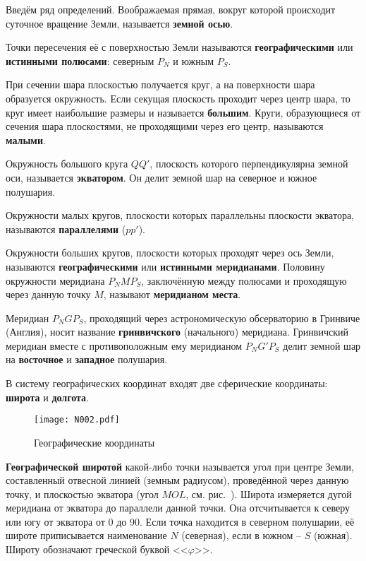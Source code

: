 Введём ряд определений. Воображаемая прямая, вокруг которой происходит
суточное вращение Земли, называется \textbf{земной осью}.

Точки пересечения её с поверхностью Земли называются
\textbf{географическими} или \textbf{истинными полюсами}: северным
$P_N$ и южным $P_S$.

При сечении шара плоскостью получается круг, а на поверхности шара
образуется окружность. Если секущая плоскость проходит через центр
шара, то круг имеет наибольшие размеры и называется
\textbf{большим}. Круги, образующиеся от сечения шара плоскостями, не
проходящими через его центр, называются \textbf{малыми}.

Окружность большого круга $QQ'$, плоскость которого перпендикулярна
земной оси, называется \textbf{экватором}. Он делит земной шар на
северное и южное полушария.

Окружности малых кругов, плоскости которых параллельны плоскости
экватора, называются \textbf{параллелями} ($pp'$).

Окружности больших кругов, плоскости которых проходят через ось Земли,
называются 
\textbf{географическими} или \textbf{истинными
  меридианами}. Половину окружности меридиана $P_NMP_S$, заключённую
между полюсами и проходящую через данную точку $M$, называют
\textbf{меридианом места}.

Меридиан $P_NGP_S$, проходящий через астрономическую обсерваторию в
Гринвиче (Англия), носит название \textbf{гринвичского} (начального)
меридиана. Гринвичский меридиан вместе с противоположным ему
меридианом $P_NG'P_S$ делит земной шар на \textbf{восточное} и
\textbf{западное} полушария.

В систему географических координат входят две сферические координаты:
 \textbf{широта} и \textbf{долгота}.

\begin{figure}[htb]
  \centering{}
  \texttt{[image: N002.pdf]}
  \caption{Географические координаты}
  \label{fig:N2}
\end{figure}

\textbf{Географической широтой}
какой-либо точки называется угол при центре Земли, составленный
отвесной линией (земным радиусом), проведённой через данную точку, и
плоскостью экватора (угол $MOL$, см. рис.~). Широта измеряется
дугой меридиана от экватора до параллели данной точки. Она
отсчитывается к северу или югу от экватора от 0 до 90\gr. Если точка
находится в северном полушарии, её широте приписывается наименование
$N$ (северная), если в южном \--- $S$ (южная). Широту обозначают
греческой буквой <<$\varphi$>>.


